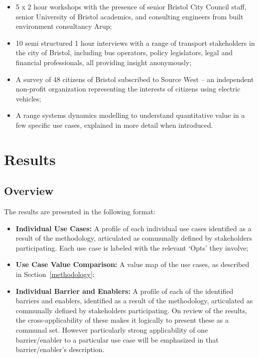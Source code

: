 \documentclass[journal]{IEEEtran}
\begin{document}
\begin{itemize}
\item 5 x 2 hour workshops with the presence of senior Bristol City
Council staff, senior University of Bristol academics, and consulting
engineers from built environment consultancy Arup;
\item 10 semi structured 1 hour interviews with a range of transport
stakeholders in the city of Bristol, including bus operators, policy
legislators, legal and financial professionals, all providing insight
anonymously;
\item A survey of 48 citizens of Bristol subscribed to Source West –
an independent non-profit organization representing the interests of
citizens using electric vehicles;
\item A range systems dynamics modelling to understand quantitative
value in a few specific use cases, explained in more detail when
introduced.
\end{itemize}


\section{Results}

\subsection{Overview}

The results are presented in the following format:

\begin{itemize}
\item {\textbf{Individual Use Cases:}} A profile of each individual
use cases identified as a result of the methodology, articulated as
communally defined by stakeholders participating. Each use case is
labeled with the relevant `Opts' they involve;
\item {\textbf{Use Case Value Comparison:}} A value map of the use
cases, as described in Section~\ref{methodology};
\item {\textbf{Individual Barrier and Enablers:}} A profile of each of
the identified barriers and enablers, identified as a result of the
methodology, articulated as communally defined by stakeholders
participating. On review of the results, the cross-applicability of
these makes it logically to present these as a communal set. However
particularly strong applicability of one barrier/enabler to a
particular use case will be emphasized in that barrier/enabler's
description.
\end{itemize}
\end{document}
